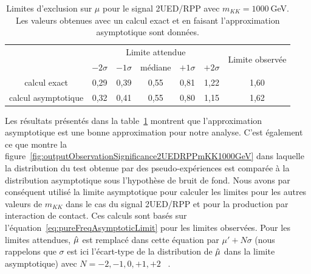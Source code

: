 \begin{table}[!htb]
  \begin{center}
    \begin{tabular}{|c|c|c|c|c|c|c|}
      \cline{2-7}
      \multicolumn{1}{c|}{} & \multicolumn{5}{c|}{Limite attendue}    &   \multirow{2}{*}{Limite observ\'ee}   \\ \cline{2-6}
      \multicolumn{1}{c|}{}  & $-2\sigma$   & $-1\sigma$  & m\'ediane  & $+1\sigma$  & $+2\sigma$ &   \\ \hline
      calcul exact  &  0,29  &  0,39 & 0,55  & 0,81 & 1,22 &  1,60 \\ \hline
      calcul asymptotique  & 0,32   & 0,41  &  0,55 & 0,80 & 1,15 & 1,62 \\ \hline
    \end{tabular}
    \caption{Limites d'exclusion sur $\mu$ pour le signal 2UED/RPP avec $m_{KK}=1000~$GeV. Les valeurs obtenues avec un calcul exact et en faisant l'approximation asymptotique sont donn\'ees.}\label{tab:comparaisonPureFrequentistAsymptotic2UEDRPPmKK1000GeV}
  \end{center}
\end{table}

Les r\'esultats pr\'esent\'es dans la table~\ref{tab:comparaisonPureFrequentistAsymptotic2UEDRPPmKK1000GeV} montrent que l'approximation asymptotique est une bonne approximation pour notre analyse. 
C'est \'egalement ce que montre la figure~\ref{fig:outputObservationSignificance2UEDRPPmKK1000GeV} dans laquelle la distribution du test obtenue par des pseudo-exp\'eriences est compar\'ee \`a la distribution asymptotique sous l'hypoth\`ese de bruit de fond.
Nous avons par cons\'equent utilis\'e la limite asymptotique pour calculer les limites pour les autres valeurs de $m_{KK}$ dans le cas du signal 2UED/RPP et pour la production par interaction de contact. 
Ces calculs sont bas\'es sur l'\'equation~\ref{eq:pureFreqAsymptoticLimit} pour les limites observ\'ees. Pour les limites attendues, $\hat{\mu}$ est remplac\'e dans cette \'equation par $\mu'+N\sigma$ (nous rappelons que $\sigma$ est ici l'\'ecart-type de la distribution de $\hat{\mu}$ dans la limite asymptotique) avec $N=-2, -1, 0, +1, +2$ ~\cite{Armbruster:1553771}. 

